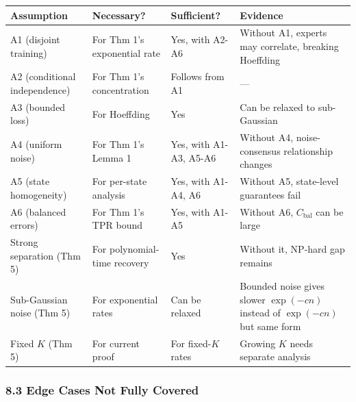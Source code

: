 \documentclass[
  12pt,
]{ctexart}
\begin{document}
\begin{longtable}[]{@{}
  >{\raggedright\arraybackslash}p{}
  >{\raggedright\arraybackslash}p{}
  >{\raggedright\arraybackslash}p{}
  >{\raggedright\arraybackslash}p{}@{}}
\toprule\noalign{}
\begin{minipage}[b]{\linewidth}\raggedright
Assumption
\end{minipage} & \begin{minipage}[b]{\linewidth}\raggedright
Necessary?
\end{minipage} & \begin{minipage}[b]{\linewidth}\raggedright
Sufficient?
\end{minipage} & \begin{minipage}[b]{\linewidth}\raggedright
Evidence
\end{minipage} \\
\midrule\noalign{}
\endhead
\bottomrule\noalign{}
\endlastfoot
A1 (disjoint training) & For Thm 1's exponential rate & Yes, with A2-A6
& Without A1, experts may correlate, breaking Hoeffding \\
A2 (conditional independence) & For Thm 1's concentration & Follows from
A1 & --- \\
A3 (bounded loss) & For Hoeffding & Yes & Can be relaxed to
sub-Gaussian \\
A4 (uniform noise) & For Thm 1's Lemma 1 & Yes, with A1-A3, A5-A6 &
Without A4, noise-consensus relationship changes \\
A5 (state homogeneity) & For per-state analysis & Yes, with A1-A4, A6 &
Without A5, state-level guarantees fail \\
A6 (balanced errors) & For Thm 1's TPR bound & Yes, with A1-A5 & Without
A6, \(C_{\text{bal}}\) can be large \\
Strong separation (Thm 5) & For polynomial-time recovery & Yes & Without
it, NP-hard gap remains \\
Sub-Gaussian noise (Thm 5) & For exponential rates & Can be relaxed &
Bounded noise gives slower \(\exp(-c n)\) instead of \(\exp(-c n)\) but
same form \\
Fixed \(K\) (Thm 5) & For current proof & For fixed-\(K\) rates &
Growing \(K\) needs separate analysis \\
\end{longtable}

\subsubsection{8.3 Edge Cases Not Fully
Covered}\label{edge-cases-not-fully-covered}
\end{document}
